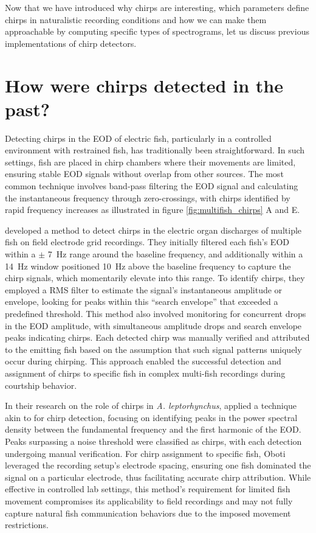 Now that we have introduced why chirps are interesting, which parameters define
chirps in naturalistic recording conditions and how we can make them
approachable by computing specific types of spectrograms, let us discuss
previous implementations of chirp detectors.

\section{How were chirps detected in the past?}
\label{sec:chirpdetectors}

Detecting chirps in the EOD of electric fish, particularly in a controlled
environment with restrained fish, has traditionally been straightforward. In
such settings, fish are placed in chirp chambers where their movements are
limited, ensuring stable EOD signals without overlap from other sources. The
most common technique involves band-pass filtering the EOD signal and
calculating the instantaneous frequency through zero-crossings, with chirps
identified by rapid frequency increases as illustrated in figure
\ref{fig:multifish_chirps} A and E.

\textcite{henningerStatisticsNaturalCommunication2018} developed a method to
detect chirps in the electric organ discharges of multiple fish on field
electrode grid recordings. They initially filtered each fish's EOD within a
$\pm$ \SI{7}{\hertz} range around the baseline frequency, and additionally
within a \SI{14}{\hertz} window positioned \SI{10}{\hertz} above the baseline
frequency to capture the chirp signals, which momentarily elevate into this
range. To identify chirps, they employed a \acrfull{RMS} filter to estimate the
signal's instantaneous amplitude or envelope, looking for peaks within this
\enquote{search envelope} that exceeded a predefined threshold. This method
also involved monitoring for concurrent drops in the EOD amplitude, with
simultaneous amplitude drops and search envelope peaks indicating chirps. Each
detected chirp was manually verified and attributed to the emitting fish based
on the assumption that such signal patterns uniquely occur during chirping.
This approach enabled the successful detection and assignment of chirps to
specific fish in complex multi-fish recordings during courtship behavior.

In their research on the role of chirps in \textit{A. leptorhynchus},
\textcite{obotiWhyBrownGhost2023} applied a technique akin to
\textcite{henningerStatisticsNaturalCommunication2018} for chirp detection,
focusing on identifying peaks in the power spectral density between the
fundamental frequency and the first harmonic of the EOD. Peaks surpassing a
noise threshold were classified as chirps, with each detection undergoing
manual verification. For chirp assignment to specific fish, Oboti
leveraged the recording setup's electrode spacing, ensuring one fish dominated
the signal on a particular electrode, thus facilitating accurate chirp
attribution. While effective in controlled lab settings, this method's
requirement for limited fish movement compromises its applicability to field
recordings and may not fully capture natural fish communication behaviors due
to the imposed movement restrictions.

